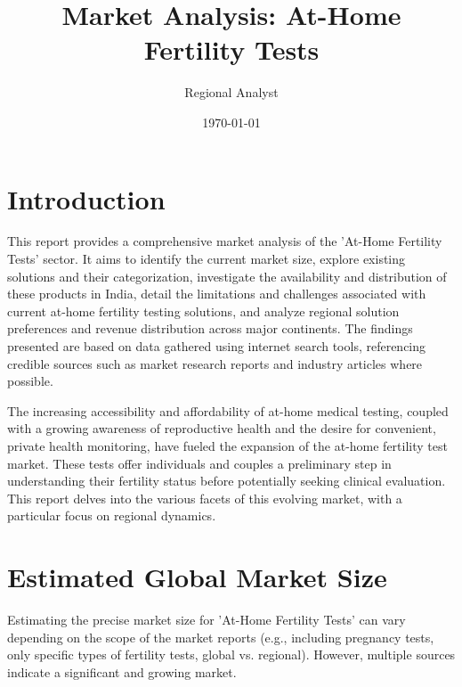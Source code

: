 \documentclass{article}
\title{Market Analysis: At-Home Fertility Tests}
\author{Regional Analyst}
\date{\today}
\begin{document}
\maketitle

\section{Introduction}
This report provides a comprehensive market analysis of the 'At-Home Fertility Tests' sector. It aims to identify the current market size, explore existing solutions and their categorization, investigate the availability and distribution of these products in India, detail the limitations and challenges associated with current at-home fertility testing solutions, and analyze regional solution preferences and revenue distribution across major continents. The findings presented are based on data gathered using internet search tools, referencing credible sources such as market research reports and industry articles where possible.

The increasing accessibility and affordability of at-home medical testing, coupled with a growing awareness of reproductive health and the desire for convenient, private health monitoring, have fueled the expansion of the at-home fertility test market. These tests offer individuals and couples a preliminary step in understanding their fertility status before potentially seeking clinical evaluation. This report delves into the various facets of this evolving market, with a particular focus on regional dynamics.

\section{Estimated Global Market Size}

Estimating the precise market size for 'At-Home Fertility Tests' can vary depending on the scope of the market reports (e.g., including pregnancy tests, only specific types of fertility tests, global vs. regional). However, multiple sources indicate a significant and growing market.
\end{document}
